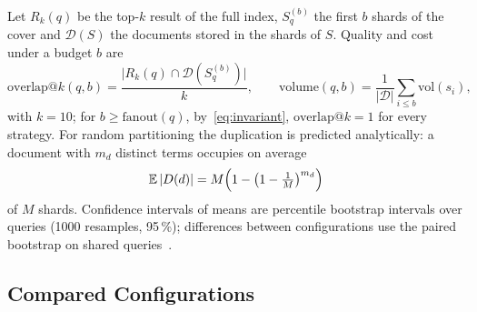 \documentclass[11pt, a4paper]{article}
\newif\ifdraftnotes
\newcommand{\todo}[1]{\ifdraftnotes\par\noindent{\small\color{red!75!black}\textbf{TODO:} #1}\par\fi}
\begin{document}
\todo{Text: the reference is the top-10 of the full index rather than judgements; overlap and probed volume (Eq.~\eqref{eq:metrics}); cover length, single-shard share, duplication, largest shard; the analytic duplication of a hash partition (Eq.~\eqref{eq:birthday}); bootstrap and paired differences; slices by connectivity and length. Materials: none.}

Let $R_k(q)$ be the top-$k$ result of the full index, $S_q^{(b)}$ the first $b$ shards of the cover and $\mathcal{D}(S)$ the documents stored in the shards of $S$.
Quality and cost under a budget $b$ are
\begin{equation}
	\mathrm{overlap}@k(q,b)=\frac{\bigl|R_k(q)\cap\mathcal{D}(S_q^{(b)})\bigr|}{k},
	\qquad
	\mathrm{volume}(q,b)=\frac{1}{|\mathcal{D}|}\sum_{i\le b}\mathrm{vol}(s_i),
	\label{eq:metrics}
\end{equation}
with $k=10$; for $b\ge\mathrm{fanout}(q)$, by~\eqref{eq:invariant}, $\mathrm{overlap}@k=1$ for every strategy.
For random partitioning the duplication is predicted analytically: a document with $m_d$ distinct terms occupies on average
\begin{equation}
	\mathbb{E}\,|D(d)|=M\Bigl(1-\bigl(1-\tfrac{1}{M}\bigr)^{m_d}\Bigr)
	\label{eq:birthday}
\end{equation}
of $M$ shards.
Confidence intervals of means are percentile bootstrap intervals over queries (1000 resamples, 95\,\%); differences between configurations use the paired bootstrap on shared queries~\cite{efron1993}.

\subsection{Compared Configurations}

\todo{Text: the main configuration (Table~\ref{tab:configuration}) was fixed before the measurements and not changed afterwards; every result of Sections~5.1--5.5 is obtained with it, and Section~5.6 checks its robustness (seed, log size, the algorithm's own parameter, one setting changed at a time); ten strategies $\times$ four algorithms; every semantic strategy is compared with a hash partition of the same shard count; Leiden is the reference algorithm in the tables, the others appear in the figures and in Table~\ref{tab:methods}. Materials: Table~\ref{tab:configuration}~--- main configuration; Table~\ref{tab:clusterings}~--- clusterings of the graph.}

\begin{table}[H]
	\caption{Main configuration: the parameter values behind every result}
	\label{tab:configuration}
	\centering
	\small
	\resizebox{\textwidth}{!}{}
\end{table}
\end{document}
